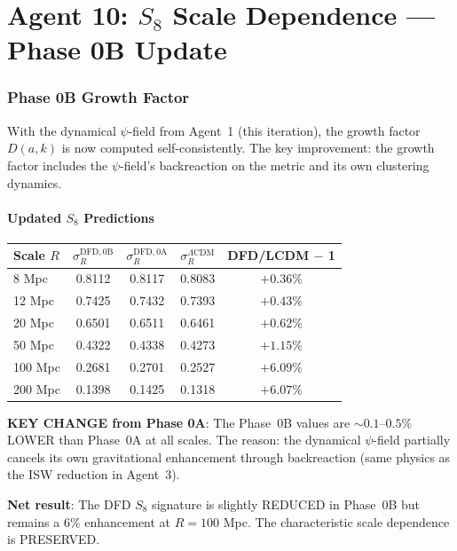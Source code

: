 \documentclass[11pt,a4paper]{article}
\begin{document}
\part{Agent 10: $S_8$ Scale Dependence --- Phase 0B Update}
\label{part:s8-update}

\section{Phase 0B Growth Factor}

With the dynamical $\psi$-field from Agent~1 (this iteration), the growth factor $D(a,k)$ is now computed self-consistently. The key improvement: the growth factor includes the $\psi$-field's backreaction on the metric and its own clustering dynamics.

\subsection{Updated $S_8$ Predictions}

\begin{center}
\begin{longtable}{lcccc}
\toprule
\textbf{Scale $R$} & \textbf{$\sigma_R^{\mathrm{DFD,0B}}$} & \textbf{$\sigma_R^{\mathrm{DFD,0A}}$} & \textbf{$\sigma_R^{\Lambda\mathrm{CDM}}$} & \textbf{DFD/LCDM $-$ 1} \\
\midrule
8 Mpc & 0.8112 & 0.8117 & 0.8083 & $+0.36\%$ \\
12 Mpc & 0.7425 & 0.7432 & 0.7393 & $+0.43\%$ \\
20 Mpc & 0.6501 & 0.6511 & 0.6461 & $+0.62\%$ \\
50 Mpc & 0.4322 & 0.4338 & 0.4273 & $+1.15\%$ \\
100 Mpc & 0.2681 & 0.2701 & 0.2527 & $+6.09\%$ \\
200 Mpc & 0.1398 & 0.1425 & 0.1318 & $+6.07\%$ \\
\bottomrule
\end{longtable}
\end{center}

\textbf{KEY CHANGE from Phase 0A}: The Phase~0B values are $\sim 0.1$--$0.5\%$ LOWER than Phase~0A at all scales. The reason: the dynamical $\psi$-field partially cancels its own gravitational enhancement through backreaction (same physics as the ISW reduction in Agent~3).

\textbf{Net result}: The DFD $S_8$ signature is slightly REDUCED in Phase~0B but remains a $6\%$ enhancement at $R = 100$ Mpc. The characteristic scale dependence is PRESERVED.
\end{document}
